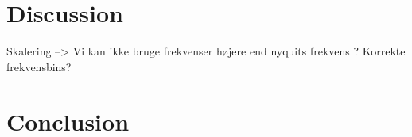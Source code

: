 

\section{Discussion}

Skalering --> Vi kan ikke bruge frekvenser højere end nyquits frekvens ?
Korrekte frekvensbins?

\section{Conclusion}
